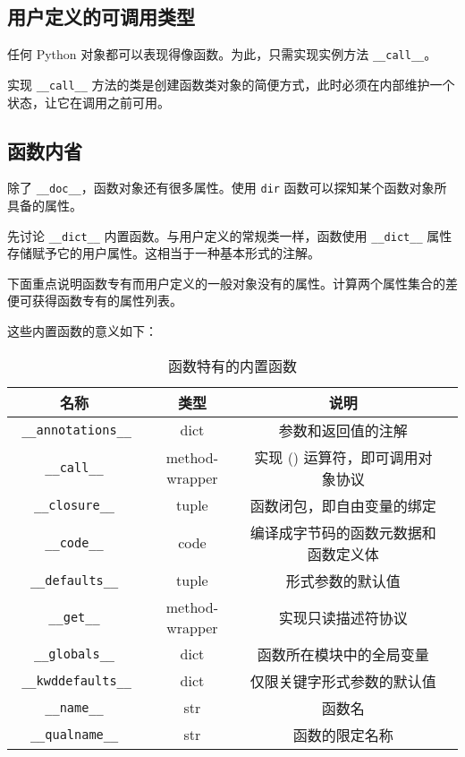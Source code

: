 \subsection{用户定义的可调用类型}

任何 Python 对象都可以表现得像函数。为此，只需实现实例方法 \texttt{\_\_call\_\_}。



实现 \texttt{\_\_call\_\_} 方法的类是创建函数类对象的简便方式，此时必须在内部维护一个状态，让它在调用之前可用。

\subsection{函数内省}

除了 \texttt{\_\_doc\_\_}，函数对象还有很多属性。使用 \texttt{dir} 函数可以探知某个函数对象所具备的属性。

先讨论 \texttt{\_\_dict\_\_} 内置函数。与用户定义的常规类一样，函数使用 \texttt{\_\_dict\_\_} 属性存储赋予它的用户属性。这相当于一种基本形式的注解。

下面重点说明函数专有而用户定义的一般对象没有的属性。计算两个属性集合的差便可获得函数专有的属性列表。



这些内置函数的意义如下：
\begin{table}[H]
    \centering
    \caption{函数特有的内置函数}
    \label{table:函数特有的内置函数}
    \setlength{\tabcolsep}{4mm}
    \begin{tabular}{c|c|cc}
        \toprule
        \textbf{名称} & \textbf{类型} & \textbf{说明} \\
        \midrule
        \texttt{ \_\_annotations\_\_ } & dict & 参数和返回值的注解 \\
        \texttt{ \_\_call\_\_ } & method-wrapper & 实现 () 运算符，即可调用对象协议 \\
        \texttt{ \_\_closure\_\_ } & tuple & 函数闭包，即自由变量的绑定 \\
        \texttt{ \_\_code\_\_ } & code & 编译成字节码的函数元数据和函数定义体 \\
        \texttt{ \_\_defaults\_\_ } & tuple & 形式参数的默认值 \\
        \texttt{ \_\_get\_\_ } & method-wrapper & 实现只读描述符协议 \\
        \texttt{ \_\_globals\_\_ } & dict & 函数所在模块中的全局变量 \\
        \texttt{ \_\_kwddefaults\_\_ } & dict & 仅限关键字形式参数的默认值 \\
        \texttt{ \_\_name\_\_ } & str & 函数名 \\
        \texttt{ \_\_qualname\_\_ } & str & 函数的限定名称 \\
        \bottomrule
    \end{tabular}
\end{table}

